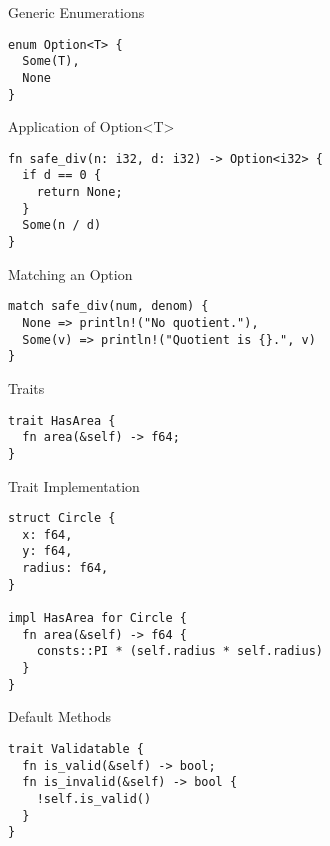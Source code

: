 \begin{frame}[fragile]{ Generic Enumerations}
\begin{verbatim}
enum Option<T> {
  Some(T),
  None
}
\end{verbatim}
\end{frame}


\begin{frame}[fragile]{Application of Option<T>}
\begin{verbatim}
fn safe_div(n: i32, d: i32) -> Option<i32> {
  if d == 0 {
    return None;
  }
  Some(n / d)
}
\end{verbatim}
\end{frame}


\begin{frame}[fragile]{Matching an Option}
\begin{verbatim}
match safe_div(num, denom) {
  None => println!("No quotient."),
  Some(v) => println!("Quotient is {}.", v)
}
\end{verbatim}
\end{frame}


\begin{frame}[fragile]{Traits}
\begin{verbatim}
trait HasArea {
  fn area(&self) -> f64;
}
\end{verbatim}
\end{frame}


\begin{frame}[fragile]{Trait Implementation}
\begin{verbatim}
struct Circle {
  x: f64,
  y: f64,
  radius: f64,
}

impl HasArea for Circle {
  fn area(&self) -> f64 {
    consts::PI * (self.radius * self.radius)
  }
}
\end{verbatim}
\end{frame}


\begin{frame}[fragile]{Default Methods}
\begin{verbatim}
trait Validatable {
  fn is_valid(&self) -> bool;
  fn is_invalid(&self) -> bool {
    !self.is_valid()
  }
}
\end{verbatim}
\end{frame}
